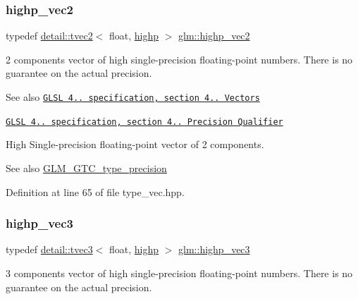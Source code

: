 \subsubsection{\texorpdfstring{highp\+\_\+vec2}{highp\_vec2}}
{\footnotesize\ttfamily typedef \hyperlink{structglm_1_1detail_1_1tvec2}{detail\+::tvec2}$<$ float, \hyperlink{namespaceglm_a0f04f086094c747d227af4425893f545ac6f7eab42eacbb10d59a58e95e362074}{highp} $>$ \hyperlink{group__core__precision_ga37645abcfcc1278567e99f1ca492bfbb}{glm\+::highp\+\_\+vec2}}

2 components vector of high single-\/precision floating-\/point numbers. There is no guarantee on the actual precision.

\begin{DoxySeeAlso}{See also}
\href{http://www.opengl.org/registry/doc/GLSLangSpec.4.20.8.pdf}{\tt G\+L\+SL 4.. specification, section 4.. Vectors} 

\href{http://www.opengl.org/registry/doc/GLSLangSpec.4.20.8.pdf}{\tt G\+L\+SL 4.. specification, section 4.. Precision Qualifier}
\end{DoxySeeAlso}
High Single-\/precision floating-\/point vector of 2 components. \begin{DoxySeeAlso}{See also}
\hyperlink{group__gtc__type__precision}{G\+L\+M\+\_\+\+G\+T\+C\+\_\+type\+\_\+precision} 
\end{DoxySeeAlso}


Definition at line 65 of file type\+\_\+vec.\+hpp.

\mbox{\label{group__core__precision_ga4879124da7a18d6b681d933cb8c4267d}} 
\subsubsection{\texorpdfstring{highp\+\_\+vec3}{highp\_vec3}}
{\footnotesize\ttfamily typedef \hyperlink{structglm_1_1detail_1_1tvec3}{detail\+::tvec3}$<$ float, \hyperlink{namespaceglm_a0f04f086094c747d227af4425893f545ac6f7eab42eacbb10d59a58e95e362074}{highp} $>$ \hyperlink{group__core__precision_ga4879124da7a18d6b681d933cb8c4267d}{glm\+::highp\+\_\+vec3}}

3 components vector of high single-\/precision floating-\/point numbers. There is no guarantee on the actual precision.

